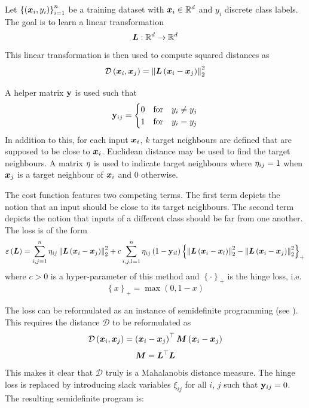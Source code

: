 Let \( \left\{ \left( \bm{x}_i, y_i \right) \right\}_{i = 1}^n \) be a training dataset with \( \bm{x}_i \in \mathbb{R}^d \) and \( y_i \) discrete class labels. The goal is to learn a linear transformation
\[ \bm{L} : \mathbb{R}^d \to \mathbb{R}^d \]
This linear transformation is then used to compute squared distances as
\[ \mathcal{D} \left( \bm{x}_i, \bm{x}_j \right) = \left\lVert \bm{L} \left( \bm{x}_i - \bm{x}_j \right) \right\rVert_2^2 \]

A helper matrix \( \mathbf{y} \) is used such that
\[ \mathbf{y}_{ij} = \begin{cases}
    0 &\text{for} \quad y_i \neq y_j \\
    1 &\text{for} \quad y_i = y_j \\
  \end{cases} \]
In addition to this, for each input \( \bm{x}_i \), \( k \) target neighbours are defined that are supposed to be close to \( \bm{x}_i \). Euclidean distance may be used to find the target neighbours. A matrix \( \mathbf{\eta} \) is used to indicate target neighbours where \( \mathbf{\eta}_{ij} = 1 \) when \( \bm{x}_j \) is a target neighbour of \( \bm{x}_i \) and \( 0 \) otherwise.

The cost function features two competing terms. The first term depicts the notion that an input should be close to its target neighbours. The second term depicts the notion that inputs of a different class should be far from one another. The loss is of the form
\[ \varepsilon \left( \bm{L} \right) = \sum_{i, j = 1}^n \mathbf{\eta}_{ij} \left\lVert \bm{L} \left( \bm{x}_i - \bm{x}_j \right) \right\rVert_2^2 + c \sum_{i, j, l = 1}^n \mathbf{\eta}_{ij} \left( 1 - \mathbf{y}_{il} \right) \left\{ \left\lVert \bm{L} \left( \bm{x}_i - \bm{x}_l \right) \right\rVert_2^2 - \left\lVert \bm{L} \left( \bm{x}_i - \bm{x}_j \right) \right\rVert_2^2 \right\}_+ \]
where \( c > 0 \) is a hyper-parameter of this method and \( \left\{ \cdot \right\}_+ \) is the hinge loss, i.e.
\[ \left\{ x \right\}_+ = \max \left( 0, 1 - x \right) \]

The loss can be reformulated as an instance of semidefinite programming (see \cite{vandenberghe_semidefinite_1996}). This requires the distance \( \mathcal{D} \) to be reformulated as
\[ \mathcal{D} \left( \bm{x}_i, \bm{x}_j \right) = \left( \bm{x}_i - \bm{x}_j \right)^\top \bm{M} \left( \bm{x}_i - \bm{x}_j \right) \]
\[ \bm{M} = \bm{L}^\top \bm{L} \]
This makes it clear that \( \mathcal{D} \) truly is a Mahalanobis distance measure. The hinge loss is replaced by introducing slack variables \( \xi_{ij} \) for all \( i \), \( j \) such that \( \mathbf{y}_{ij} = 0 \). The resulting semidefinite program is: \\

